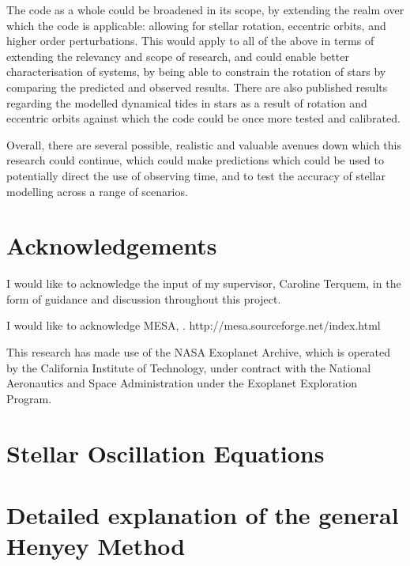 \documentclass[11pt]{amsart}
\begin{document}
The code as a whole could be broadened in its scope, by extending the realm over which the code is applicable: allowing for stellar rotation, eccentric orbits, and higher order perturbations.  This would apply to all of the above in terms of extending the relevancy and scope of research, and could enable better characterisation of systems, by being able to constrain the rotation of stars by comparing the predicted and observed results.  There are also published results regarding the modelled dynamical tides in stars as a result of rotation and eccentric orbits \cite{Burkart2012} against which the code could be once more tested and calibrated.

Overall, there are several possible, realistic and valuable avenues down which this research could continue, which could make predictions which could be used to potentially direct the use of observing time, and to test the accuracy of stellar modelling across a range of scenarios.





\section{Acknowledgements}  \label{Acknowledgements}

I would like to acknowledge the input of my supervisor, Caroline Terquem, in the form of guidance and discussion throughout this project.

I would like to acknowledge MESA, \cite{Paxton2011}. http://mesa.sourceforge.net/index.html

This research has made use of the NASA Exoplanet Archive, which is operated by the California Institute of Technology, under contract with the National Aeronautics and Space Administration under the Exoplanet Exploration Program.
















\newpage

\appendix

\section{Stellar Oscillation Equations} \label{ap:Osc}


\section{Detailed explanation of the general Henyey Method}   \label{ap:Henyey}
\end{document}
